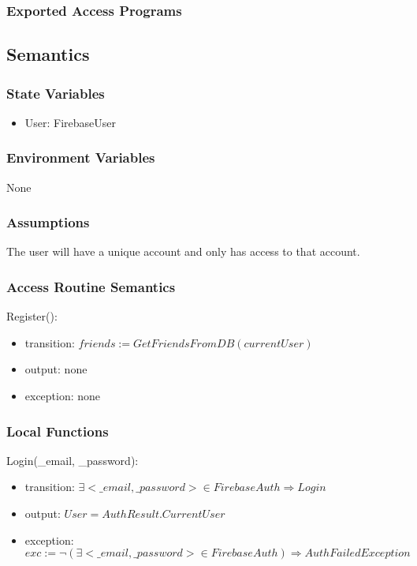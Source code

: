 \documentclass[12pt, titlepage]{article}
\begin{document}
\subsubsection{Exported Access Programs}

\subsection{Semantics}

\subsubsection{State Variables}

\begin{itemize}
\item User: FirebaseUser
\end{itemize}

\subsubsection{Environment Variables}

None

\subsubsection{Assumptions}

The user will have a unique account and only has access to that account.

\subsubsection{Access Routine Semantics}

\noindent Register():
\begin{itemize}
\item transition: $friends := GetFriendsFromDB(currentUser)$ 
\item output: none
\item exception: none
\end{itemize}

\subsubsection{Local Functions}

\noindent Login(\_email, \_password):
\begin{itemize}
\item transition: $\exists <\_email, \_password> \in FirebaseAuth \Rightarrow Login$
\item output: $User = AuthResult.CurrentUser$
\item exception: $exc:= \lnot(\exists <\_email, \_password> \in FirebaseAuth) \Rightarrow AuthFailedException$
\end{itemize}
\end{document}
